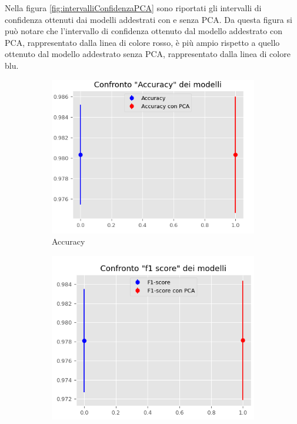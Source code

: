 Nella figura \ref{fig:intervalliConfidenzaPCA} sono riportati gli intervalli di
confidenza ottenuti dai modelli addestrati con e senza PCA. Da questa figura si
può notare che l'intervallo di confidenza ottenuto dal modello addestrato con
PCA, rappresentato dalla linea di colore rosso, è più ampio rispetto a quello 
ottenuto dal modello addestrato senza PCA, rappresentato dalla linea di colore blu.
\begin{figure}[!ht]
    \centering
    \begin{subfigure}[b]{0.4\textwidth}
        \centering
        \includegraphics[width=\textwidth]{img/rete/intervalliAcc.png}
        \caption{Accuracy}
        \label{fig:acc}
    \end{subfigure}
    \hfill
    \begin{subfigure}[b]{0.4\textwidth}
        \centering
        \includegraphics[width=\textwidth]{img/rete/intervalliF1.png}

\end{subfigure}
\end{figure}
